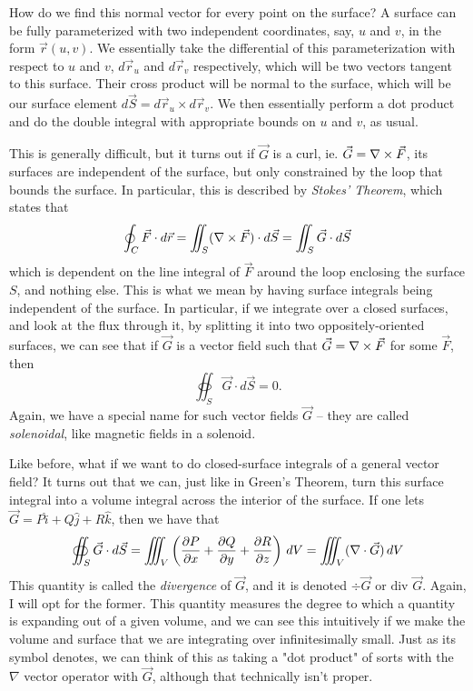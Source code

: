 How do we find this normal vector for every point on the surface? A surface can be fully parameterized with two independent coordinates, say, $u$ and $v$, in the form $\vec r(u, v)$. We essentially take the differential of this parameterization with respect to $u$ and $v$, $d\vec r_u$ and $d\vec r_v$ respectively, which will be two vectors tangent to this surface. Their cross product will be normal to the surface, which will be our surface element $d\vec S = d\vec r_u \times d\vec r_v$. We then essentially perform a dot product and do the double integral with appropriate bounds on $u$ and $v$, as usual. 

This is generally difficult, but it turns out if $\vec G$ is a curl, ie. $\vec G = \nabla \times \vec F$, its surfaces are independent of the surface, but only constrained by the loop that bounds the surface. In particular, this is described by \textit{Stokes' Theorem}, which states that 
\[
	\oint_C \vec F \cdot d\vec r = \iint_S (\nabla \times \vec F) \cdot d\vec S = \iint_S \vec G \cdot d\vec S
\]
which is dependent on the line integral of $\vec F$ around the loop enclosing the surface $S$, and nothing else. This is what we mean by having surface integrals being independent of the surface. In particular, if we integrate over a closed surfaces, and look at the flux through it, by splitting it into two oppositely-oriented surfaces, we can see that if $\vec G$ is a vector field such that $\vec G = \nabla \times \vec F$ for some $\vec F$, then
\[
	 \oiint_S \vec G \cdot d\vec S = 0. 
\]
Again, we have a special name for such vector fields $\vec G$ -- they are called \textit{solenoidal}, like magnetic fields in a solenoid. 

Like before, what if we want to do closed-surface integrals of a general vector field? It turns out that we can, just like in Green's Theorem, turn this surface integral into a volume integral across the interior of the surface. If one lets $\vec G = P\hat i + Q \hat j + R \hat k$, then we have that 
\[
	\oiint_S \vec G \cdot d\vec S = \iiint_V \left(\frac{\partial P}{\partial x} + \frac{\partial Q}{\partial y} + \frac{\partial R}{\partial z} \right) \, dV =  \iiint_V (\nabla \cdot \vec G) \, dV
\] 
This quantity is called the \textit{divergence} of $\vec G$, and it is denoted $\div \vec G$ or $\text{div } \vec G$. Again, I will opt for the former. This quantity measures the degree to which a quantity is expanding out of a given volume, and we can see this intuitively if we make the volume and surface that we are integrating over infinitesimally small. Just as its symbol denotes, we can think of this as taking a "dot product" of sorts with the $\nabla$ vector operator with $\vec G$, although that technically isn't proper. 

